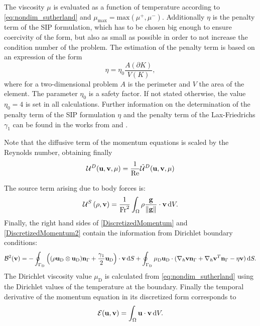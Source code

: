 The viscosity $\mu$ is evaluated as a function of temperature according to \cref{eq:nondim_sutherland} and $\mu_{\text{max}} = \text{max}(\mu^{+}, \mu^{-})$.  Additionally  $\eta$ is the penalty term of the SIP formulation, which has to be chosen big enough to ensure coercivity of the form, but also as small as possible in order to not increase the condition number of the problem. The estimation of the penalty term is based on an expression of the form
\begin{equation}
	\eta = \eta_0 \frac{A(\partial K)}{V(K)},
\end{equation}\label{eq:PenaltyFactor}
where for a two-dimensional problem $A$ is the perimeter and $V$ the area of the element. The parameter $\eta_0$ is a safety factor. If not stated otherwise, the value  $\eta_0 = 4$ is  set in all calculations. Further information on the determination of the penalty term of the SIP formulation $\eta$ and the penalty term of the Lax-Friedrichs $\gamma_1 $ can be found in  the works from \textcite{hesthavenNodalDiscontinuousGalerkin2008} and \textcite{hillewaertDevelopmentDiscontinuousGalerkin2013}.

Note that the diffusive term of the momentum equations is scaled by the Reynolds number, obtaining finally
\begin{equation}
		\mathcal{U}^D(\textbf{u},\textbf{v},\mu) = 	\frac{1}{\text{Re}}\tilde{\mathcal{U}}^D(\textbf{u},\textbf{v},\mu)
\end{equation}

The source term arising due to body forces is:
\begin{equation}
	\mathcal{U}^S\left(\rho, \textbf{v}\right) =  \smash{\frac{1}{\text{Fr}^2}}\int_{\Omega}{  \rho \frac{\textbf{g}}{\Vert \textbf{g} \Vert}\cdot \textbf{v}} \,\mathrm{d} V.  \label{eq:Mom_source}
\end{equation}
Finally, the right hand sides of \cref{DiscretizedMomentum} and \cref{DiscretizedMomentum2} contain the information from Dirichlet boundary conditions:
\begin{equation}
	\mathcal{B}^2(\textbf{v}) =
	-\oint_{\Gamma_{\text{D}}}{ \left( (\rho\textbf{u}_{\text{D}}\otimes\textbf{u}_{\text{D}} )\textbf{n}_{\Gamma} + \frac{\gamma_1}{2}\textbf{u}_{\text{D}}\right)\cdot\textbf{v} \,\mathrm{d} S}  +
	\oint_{\Gamma_{\text{D}}}{\mu_{\text{D}}\textbf{u}_{\text{D}}\cdot(\nabla_h\textbf{v} \textbf{n}_{\Gamma} + \nabla_h\textbf{v}^T \textbf{n}_{\Gamma}- \eta \textbf{v} )\,\mathrm{d} S.}
\end{equation}
The Dirichlet viscosity value $\mu_{\text{D}}$ is calculated from \cref{eq:nondim_sutherland} using the Dirichlet values of the temperature at the boundary.
Finally the temporal derivative of the momentum equation in its discretized form corresponds to
\begin{equation}
\mathcal{E} (\textbf{u},\textbf{v}) =   \int_{\Omega}{\textbf{u}\cdot\textbf{v}} \,\mathrm{d} V.
\end{equation}
